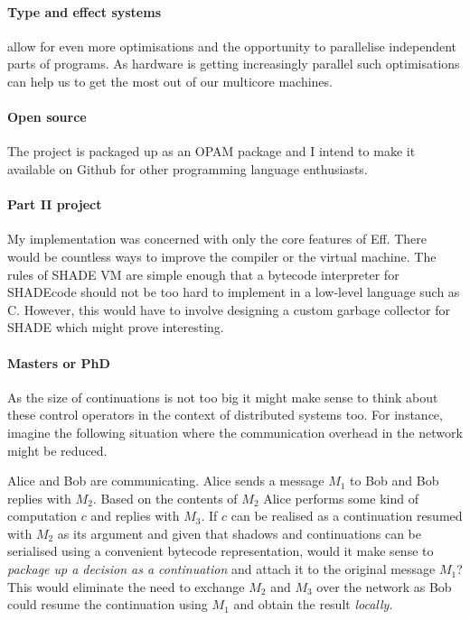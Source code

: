 \documentclass[class=article, crop=false]{standalone}
\begin{document}
\paragraph{Type and effect systems \cite{bauer2013effect}}
allow for even more optimisations
and the opportunity to parallelise independent parts of programs. As hardware is
getting increasingly parallel such optimisations can help us to get the most out
of our multicore machines.

\paragraph{Open source}
The project is packaged up as an OPAM package and I intend to make it available
on Github for other programming language enthusiasts.

\paragraph{Part II project}
My implementation was concerned with only the core
features of Eff. There would be countless ways to improve the compiler or the
virtual machine. The rules of SHADE VM are simple enough that a bytecode interpreter
for SHADEcode should not be too hard to implement in a low-level language such as C.
However, this would have to involve designing a custom garbage collector for SHADE
which might prove interesting.

\paragraph{Masters or PhD}
As the size of continuations is not too big it might make sense to think about
these control operators in the context of distributed systems too.
For instance, imagine the following situation where the communication overhead
in the network might be reduced.

Alice and Bob are communicating. Alice sends a message $M_1$ to Bob and Bob
replies with $M_2$. Based on the contents of $M_2$ Alice performs some kind of
computation $c$ and replies with $M_3$. If $c$ can be realised as a continuation
resumed with $M_2$ as its argument and given that shadows and continuations can be
serialised using a convenient bytecode representation, would it make sense to
\emph{package up a decision as a continuation} and attach it to the original
message $M_1$? This would eliminate the need to exchange $M_2$ and $M_3$
over the network as Bob could resume the continuation using $M_1$ and obtain
the result \emph{locally}.
\end{document}
